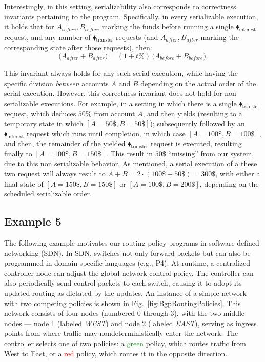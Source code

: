 Interestingly, in this setting, serializability also corresponds to correctness invariants pertaining to the program. Specifically, in every serializable execution, it holds that for $A_{\textit{before}},B_{\textit{before}}$ marking the funds before running a single {\color{ForestGreen}$\blacklozenge_\text{interest}$} request, and any number of {\color{ForestGreen}$\blacklozenge_\text{transfer}$} requests (and $A_{\textit{after}},B_{\textit{after}}$ marking the corresponding state after those requests), then:
\[
\bigl(A_{\mathit{after}} + B_{\mathit{after}}\bigr)
= (1 + t\%)\,\bigl(A_{\mathit{before}} + B_{\mathit{before}}\bigr).
\]

This invariant always holds for any such serial execution, while having the specific division \textit{between} accounts $A$ and $B$ depending on the actual order of the serial execution.
%
However, this correctness invariant does not hold for non serializable executions. For example, in a setting in which there is a single {\color{ForestGreen}$\blacklozenge_\text{transfer}$} request, which deduces $50\%$ from account $A$, and then yields (resulting to a temporary state in which $[A=50\$,B=50\$]$); subsequently followed by an  {\color{ForestGreen}$\blacklozenge_\text{interest}$} request which runs until completion, in which case  $[A=100\$,B=100\$]$, and then, the remainder of the yielded {\color{ForestGreen}$\blacklozenge_\text{transfer}$} request is executed, resulting finally to $[A=100\$, B=150\$]$.  This result in $50\$$ ``missing'' from our system, due to this non serializable behavior.
%
As mentioned, a serial execution of a these two request will always result to 
$A+B=2\cdot (100\$+50\$)=300\$$, with either a final state of $[A=150\$, B=150\$]$ or $[A=100\$, B=200\$]$, depending on the scheduled serializable order.




\subsection{Example 5}

The following example motivates our routing‐policy programs in software‐defined networking (SDN). In SDN, switches not only forward packets but can also be programmed in domain‐specific languages (e.g., P4). At runtime, a centralized controller node can adjust the global network control policy. The controller can also periodically send control packets to each switch, causing it to adopt its updated routing as dictated by the updates.
%
An instance of a simple network with two competing policies is shown in Fig.~\ref{fig:BgpRoutingPolicies}. This network consists of four nodes (numbered 0 through 3), with the two middle nodes --- node 1 (labeled \textit{WEST}) and node 2 (labeled \textit{EAST}), serving as ingress points from where traffic may nondeterministically enter the network. The controller selects one of two policies: a \textcolor{ForestGreen}{green} policy, which routes traffic from West to East, or a \textcolor{red}{red} policy, which routes it in the opposite direction.


